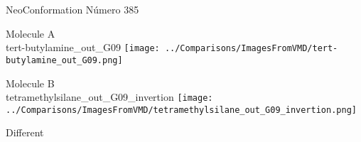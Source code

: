  \newpage

\vtab[-3cm]
\begin{center}
{\large NeoConformation \tab Número 385}
\end{center}
\begin{multicols}{2}
\begin{center}
Molecule A \\ 
tert-butylamine\_out\_G09
\texttt{[image: ../Comparisons/ImagesFromVMD/tert-butylamine\_out\_G09.png]}
\\
\vtab

\columnbreak
Molecule B \\ 
tetramethylsilane\_out\_G09\_invertion
\texttt{[image: ../Comparisons/ImagesFromVMD/tetramethylsilane\_out\_G09\_invertion.png]}
\\
\vtab


\end{center}
\end{multicols}
\begin{center}
\textcolor{NavyBlue}{\Large Different}
\end{center}

 \newpage

